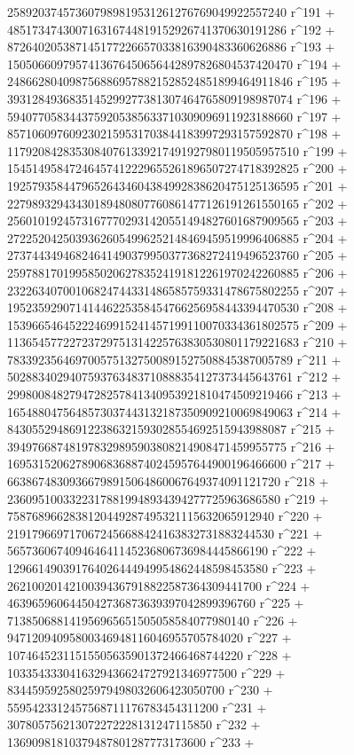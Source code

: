        258920374573607989819531261276769049922557240 r^191 + 
       485173474300716316744819152926741370630191286 r^192 + 
       872640205387145177226657033816390483360626886 r^193 + 
       1505066097957413676450656442897826804537420470 r^194 + 
       2486628040987568869578821528524851899464911846 r^195 + 
       3931284936835145299277381307464765809198987074 r^196 + 
       5940770583443759205385633710309096911923188660 r^197 + 
       8571060976092302159531703844183997293157592870 r^198 + 
       11792084283530840761339217491927980119505957510 r^199 + 
       15451495847246457412229655261896507274718392825 r^200 + 
       19257935844796526434604384992838620475125136595 r^201 + 
       22798932943430189480807760861477126191261550165 r^202 + 
       25601019245731677702931420551494827601687909565 r^203 + 
       27225204250393626054996252148469459519996406885 r^204 + 
       27374434946824641490379950377368272419496523760 r^205 + 
       25978817019958502062783524191812261970242260885 r^206 + 
       23226340700106824744331486585759331478675802255 r^207 + 
       19523592907141446225358454766256958443394470530 r^208 + 
       15396654645222469915241457199110070334361802575 r^209 + 
       11365457722723729751314225763830530801179221683 r^210 + 
       7833923564697005751327500891527508845387005789 r^211 + 
       5028834029407593763483710888354127373445643761 r^212 + 
       2998008482794728257841340953921810474509219466 r^213 + 
       1654880475648573037443132187350909210069849063 r^214 + 
       843055294869122386321593028554692515943988087 r^215 + 
       394976687481978329895903808214908471459955775 r^216 + 
       169531520627890683688740245957644900196466600 r^217 + 
       66386748309366798915064860067649374091121720 r^218 + 
       23609510033223178819948934394277725963686580 r^219 + 
       7587689662838120449287495321115632065912940 r^220 + 
       2191796697170672456688424163832731883244530 r^221 + 
       565736067409464641145236806736984445866190 r^222 + 
       129661490391764026444949954862448598453580 r^223 + 
       26210020142100394367918822587364309441700 r^224 + 
       4639659606445042736873639397042899396760 r^225 + 
       713850688141956965651505058584077980140 r^226 + 
       94712094095800346948116046955705784020 r^227 + 
       10746452311515505635901372466468744220 r^228 + 
       1033543330416329436624727921346977500 r^229 + 
       83445959258025979498032606423050700 r^230 + 
       5595423312457568711176783454311200 r^231 + 
       307805756213072272228131247115850 r^232 + 
       13690981810379487801287773173600 r^233 + 
